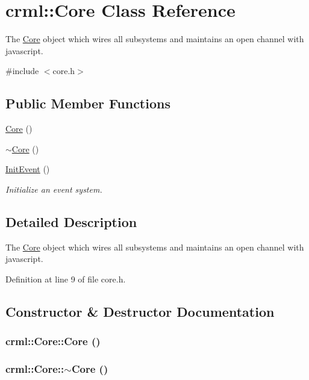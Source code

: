 \hypertarget{classcrml_1_1_core}{
\section{crml::Core Class Reference}
\label{classcrml_1_1_core}
}


The \hyperlink{classcrml_1_1_core}{Core} object which wires all subsystems and maintains an open channel with javascript.  




{\ttfamily \#include $<$core.h$>$}

\subsection*{Public Member Functions}
\begin{DoxyCompactItemize}
\item 
\hyperlink{classcrml_1_1_core_a114b61db0d73f1661af6541697480ec7}{Core} ()
\item 
\hyperlink{classcrml_1_1_core_ac7d8f9cf90da2e7443a4d029aff56e1b}{$\sim$Core} ()
\item 
\hyperlink{classcrml_1_1_core_a9ecaf3f48d06f7f51be8f67767c7d3a3}{InitEvent} ()
\begin{DoxyCompactList}\small\item\em Initialize an event system. \item\end{DoxyCompactList}\end{DoxyCompactItemize}


\subsection{Detailed Description}
The \hyperlink{classcrml_1_1_core}{Core} object which wires all subsystems and maintains an open channel with javascript. 

Definition at line 9 of file core.h.



\subsection{Constructor \& Destructor Documentation}
\hypertarget{classcrml_1_1_core_a114b61db0d73f1661af6541697480ec7}{
\subsubsection[{Core}]{\setlength{\rightskip}{0pt plus 5cm}crml::Core::Core ()}}
\label{classcrml_1_1_core_a114b61db0d73f1661af6541697480ec7}
\hypertarget{classcrml_1_1_core_ac7d8f9cf90da2e7443a4d029aff56e1b}{
\subsubsection[{$\sim$Core}]{\setlength{\rightskip}{0pt plus 5cm}crml::Core::$\sim$Core ()}}
\label{classcrml_1_1_core_ac7d8f9cf90da2e7443a4d029aff56e1b}


